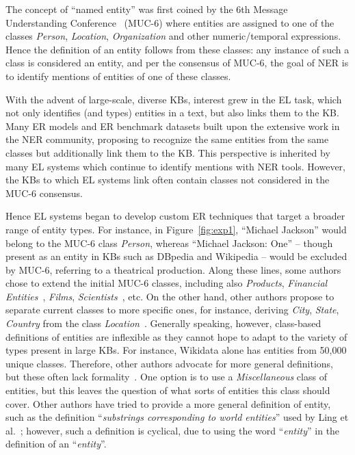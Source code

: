 \documentclass[sigconf]{acmart}
\begin{document}
The concept of ``named entity'' was first coined by the 6th Message Understanding Conference~\cite{GrishmanS96} (MUC-6) where entities are assigned to one of the classes \textit{Person}, \textit{Location}, \textit{Organization} and other numeric/temporal expressions. Hence the definition of an entity follows from these classes: any instance of such a class is considered an entity, and per the consensus of MUC-6, the goal of NER is to identify mentions of entities of one of these classes.

With the advent of large-scale, diverse KBs, interest grew in the EL task, which not only identifies (and types) entities in a text, but also links them to the KB. Many ER models and ER benchmark datasets built upon the extensive work in the NER community, proposing to recognize the same entities from the same classes but additionally link them to the KB. This perspective is inherited by many EL systems which continue to identify mentions with NER tools. However, the KBs to which EL systems link often contain classes not considered in the MUC-6 consensus. 

Hence EL systems began to develop custom ER techniques that target a broader range of entity types. For instance, in Figure~\ref{fig:exp1}, ``Michael Jackson'' would belong to the MUC-6 class \textit{Person}, whereas ``Michael Jackson: One'' -- though present as an entity in KBs such as DBpedia and Wikipedia -- would be excluded by MUC-6, referring to a theatrical production. Along these lines, some authors chose to extend the initial MUC-6 classes, including also \textit{Products}, \textit{Financial Entities}~\cite{MinardSUAESS16}, \textit{Films}, \textit{Scientists}~\cite{EtzioniCDPSSWY05}, etc. On the other hand, other authors propose to separate current classes to more specific ones, for instance, deriving \textit{City}, \textit{State}, \textit{Country} from the class \textit{Location}~\cite{Fleischman01}. Generally speaking, however, 
class-based definitions of entities are inflexible as they cannot hope to adapt to the variety of types present in large KBs. For instance, Wikidata alone has entities from 50,000 unique classes. Therefore, other authors advocate for more general definitions, but these often lack formality~\cite{EckhardtHPS14, UrenCIHVMC06}. One option is to use a \textit{Miscellaneous} class of entities, but this leaves the question of what sorts of entities this class should cover. Other authors have tried to provide a more general definition of entity, such as the definition ``\textit{substrings corresponding to world entities}'' used by Ling et al.~\cite{LingSW15}; however, such a definition is cyclical, due to using the word ``\textit{entity}'' in the definition of an ``\textit{entity}''. 
\end{document}
